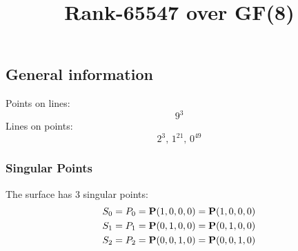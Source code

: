 \documentclass{article}
\newcommand\setTBstruts{\def\T{\rule{0pt}{2.6ex}}%
\def\B{\rule[-1.2ex]{0pt}{0pt}}}
\newcommand{\bP}{{\bf P}}
\begin{document}
 
\setTBstruts



{\allowdisplaybreaks%






\title{Rank-65547 over GF(8)}
\author{}%
\maketitle%
%
{}



\subsection*{General information}
Points on lines:
$$
9^3$$
Lines on points:
$$
2^3,\,1^{21},\,0^{49}$$
\subsubsection*{Singular Points}
The surface has 3 singular points:\\
\begin{align*}
S_{0} &= P_{0}=\bP(1, 0, 0, 0) = \bP(1, 0, 0, 0)\\
S_{1} &= P_{1}=\bP(0, 1, 0, 0) = \bP(0, 1, 0, 0)\\
S_{2} &= P_{2}=\bP(0, 0, 1, 0) = \bP(0, 0, 1, 0)\\
\end{align*}
}
\end{document}
